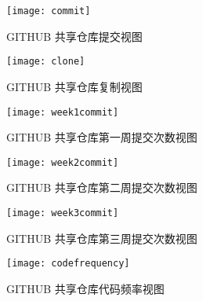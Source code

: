 \begin{figure}[htbp]
    \centering
    \texttt{[image: commit]}
    \caption{GITHUB 共享仓库提交视图}\label{fig:commit}
    \vspace{\baselineskip}
\end{figure}
\begin{figure}[htbp]
    \centering
    \texttt{[image: clone]}
    \caption{GITHUB 共享仓库复制视图}\label{fig:clone}
    \vspace{\baselineskip}
\end{figure}
\begin{figure}[htbp]
    \centering
    \texttt{[image: week1commit]}
    \caption{GITHUB 共享仓库第一周提交次数视图}\label{fig:week1commit}
    \vspace{\baselineskip}
\end{figure}
\begin{figure}[htbp]
    \centering
    \texttt{[image: week2commit]}
    \caption{GITHUB 共享仓库第二周提交次数视图}\label{fig:week2commit}
    \vspace{\baselineskip}
\end{figure}
\begin{figure}[htbp]
    \centering
    \texttt{[image: week3commit]}
    \caption{GITHUB 共享仓库第三周提交次数视图}\label{fig:week3commit}
    \vspace{\baselineskip}
\end{figure}
\begin{figure}[htbp]
    \centering
    \texttt{[image: codefrequency]}
    \caption{GITHUB 共享仓库代码频率视图}\label{fig:codefrequency}
    \vspace{\baselineskip}
\end{figure}